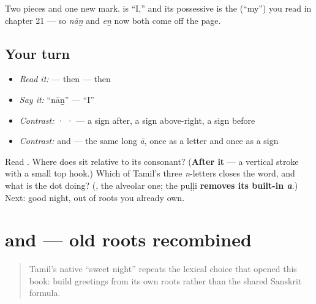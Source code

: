Two pieces and one new mark. \textbf{} is \textquotedblleft{}I,\textquotedblright{} and its possessive is the \textbf{} (\textquotedblleft{}my\textquotedblright{}) you read in chapter 21 — so \emph{nāṉ} and \emph{eṉ} now both come off the page.

\subsection*{Your turn}
\begin{itemize}
\raggedright
  \item \emph{Read it:} \textbf{} — then \textbf{} — then \textbf{}
  \item \emph{Say it:} \textquotedblleft{}nāṉ\textquotedblright{} — \textquotedblleft{}I\textquotedblright{}
  \item \emph{Contrast:} \textbf{} · \textbf{} · \textbf{} — a sign after, a sign above-right, a sign before
  \item \emph{Contrast:} \textbf{} and \textbf{} — the same long \emph{ā}, once as a letter and once as a sign
\end{itemize}

\begin{tcolorbox}[breakable,colback=teal!4,colframe=teal!35!black,title={Before you move on}]
Read \textbf{}. Where does \textbf{} sit relative to its consonant? (\textbf{After it} — a vertical stroke with a small top hook.) Which of Tamil's three \emph{n}-letters closes the word, and what is the dot doing? (\textbf{}, the alveolar one; the puḷḷi \textbf{removes its built-in \emph{a}}.) Next: good night, out of roots you already own.
\end{tcolorbox}
\section[\texorpdfstring{\ta{நல்ல} \ta{இரவு} / \ta{இரவு} … (nalla iravu …)}{நல்ல இரவு / இரவு … (nalla iravu …)}]{  and   — old roots recombined}

\label{lesson:TA-C25-goodnight-alternatives}



\begin{quote}
Tamil's native \textquotedblleft{}sweet night\textquotedblright{} repeats the lexical choice that opened this book: build greetings from its own roots rather than the shared Sanskrit formula.
\end{quote}


